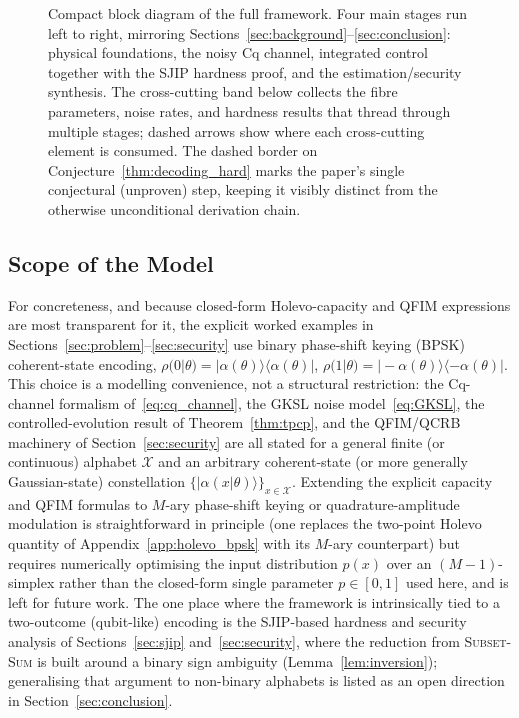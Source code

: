 \documentclass[journal,twocolumn]{IEEEtran}
\theoremstyle{definition}
\theoremstyle{plain}
\begin{document}
\begin{figure}[t]
{%
}
\caption{Compact block diagram of the full framework. Four main
  stages run left to right, mirroring
  Sections~\ref{sec:background}--\ref{sec:conclusion}: physical
  foundations, the noisy Cq channel, integrated control together with
  the SJIP hardness proof, and the estimation/security synthesis.
  The cross-cutting band below collects the fibre parameters, noise
  rates, and hardness results that thread through multiple stages;
  dashed arrows show where each cross-cutting element is consumed.
  The dashed border on Conjecture~\ref{thm:decoding_hard} marks
  the paper's single conjectural (unproven) step, keeping it visibly
  distinct from the otherwise unconditional derivation chain.}
\label{fig:framework}
\end{figure}

\subsection{Scope of the Model}
\label{subsec:scope}

For concreteness, and because closed-form Holevo-capacity and QFIM
expressions are most transparent for it, the explicit worked
examples in Sections~\ref{sec:problem}--\ref{sec:security} use
binary phase-shift keying (BPSK) coherent-state encoding,
$\rho(0|\theta)=|\alpha(\theta)\rangle\langle\alpha(\theta)|$,
$\rho(1|\theta)=|-\alpha(\theta)\rangle\langle-\alpha(\theta)|$. This
choice is a modelling convenience, not a structural restriction: the
Cq-channel formalism of~\eqref{eq:cq_channel}, the GKSL noise
model~\eqref{eq:GKSL}, the controlled-evolution result of
Theorem~\ref{thm:tpcp}, and the QFIM/QCRB machinery of
Section~\ref{sec:security} are all stated for a general finite (or
continuous) alphabet $\mathcal{X}$ and an arbitrary coherent-state (or
more generally Gaussian-state) constellation $\{|\alpha(x|\theta)\rangle\}_{x\in\mathcal X}$.
Extending the explicit capacity and QFIM formulas to $M$-ary
phase-shift keying or quadrature-amplitude modulation is
straightforward in principle (one replaces the two-point Holevo
quantity of Appendix~\ref{app:holevo_bpsk} with its $M$-ary
counterpart) but requires numerically optimising the input
distribution $p(x)$ over an $(M-1)$-simplex rather than the closed-form
single parameter $p\in[0,1]$ used here, and is left for future work.
The one place where the framework is intrinsically tied to a
two-outcome (qubit-like) encoding is the SJIP-based hardness and
security analysis of Sections~\ref{sec:sjip} and~\ref{sec:security},
where the reduction from \textsc{Subset-Sum} is built around a
binary sign ambiguity (Lemma~\ref{lem:inversion}); generalising that
argument to non-binary alphabets is listed as an open direction in
Section~\ref{sec:conclusion}.
\end{document}
